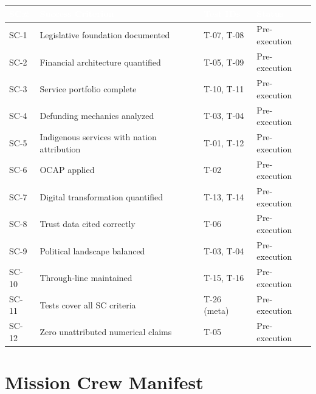 \documentclass[11pt,letterpaper]{article}
\newcommand{\tableheader}[1]{\textbf{\sffamily\textcolor{white}{#1}}}
\begin{document}
\begin{center}
\begin{tabularx}{\textwidth}{C{1cm}X L{2.5cm} C{2cm}}
\toprule
{}
\tableheader{SC\#} & \tableheader{Success Criterion} & \tableheader{Test IDs} & \tableheader{Status} \\
\midrule
SC-1 & Legislative foundation documented & T-07, T-08 & Pre-execution \\
SC-2 & Financial architecture quantified & T-05, T-09 & Pre-execution \\
SC-3 & Service portfolio complete & T-10, T-11 & Pre-execution \\
SC-4 & Defunding mechanics analyzed & T-03, T-04 & Pre-execution \\
SC-5 & Indigenous services with nation attribution & T-01, T-12 & Pre-execution \\
SC-6 & OCAP applied & T-02 & Pre-execution \\
SC-7 & Digital transformation quantified & T-13, T-14 & Pre-execution \\
SC-8 & Trust data cited correctly & T-06 & Pre-execution \\
SC-9 & Political landscape balanced & T-03, T-04 & Pre-execution \\
SC-10 & Through-line maintained & T-15, T-16 & Pre-execution \\
SC-11 & Tests cover all SC criteria & T-26 (meta) & Pre-execution \\
SC-12 & Zero unattributed numerical claims & T-05 & Pre-execution \\
\bottomrule
\end{tabularx}
\end{center}

\section{Mission Crew Manifest}
\end{document}
